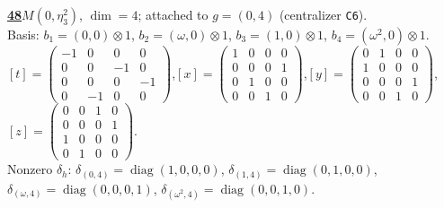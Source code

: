 \begin{samepage}\noindent\textbf{\underline{48}}\quad $M(0,\eta^{2}_{3})$, $\dim=4$; attached to $g=(0,4)$ (centralizer \texttt{C6}).\\
Basis: $b_{1}=(0,0)\otimes 1$, $b_{2}=(\omega,0)\otimes 1$, $b_{3}=(1,0)\otimes 1$, $b_{4}=(\omega^2,0)\otimes 1$.\\
$[t]=\left(\begin{smallmatrix} -1 & 0 & 0 & 0 \\ 0 & 0 & -1 & 0 \\ 0 & 0 & 0 & -1 \\ 0 & -1 & 0 & 0 \end{smallmatrix}\right)$,\quad $[x]=\left(\begin{smallmatrix} 1 & 0 & 0 & 0 \\ 0 & 0 & 0 & 1 \\ 0 & 1 & 0 & 0 \\ 0 & 0 & 1 & 0 \end{smallmatrix}\right)$,\quad $[y]=\left(\begin{smallmatrix} 0 & 1 & 0 & 0 \\ 1 & 0 & 0 & 0 \\ 0 & 0 & 0 & 1 \\ 0 & 0 & 1 & 0 \end{smallmatrix}\right)$,\quad $[z]=\left(\begin{smallmatrix} 0 & 0 & 1 & 0 \\ 0 & 0 & 0 & 1 \\ 1 & 0 & 0 & 0 \\ 0 & 1 & 0 & 0 \end{smallmatrix}\right)$.\\
Nonzero $\delta_h$: $\delta_{(0,4)}=\operatorname{diag}(1,0,0,0)$, $\delta_{(1,4)}=\operatorname{diag}(0,1,0,0)$, $\delta_{(\omega,4)}=\operatorname{diag}(0,0,0,1)$, $\delta_{(\omega^2,4)}=\operatorname{diag}(0,0,1,0)$.\end{samepage}
\medskip

